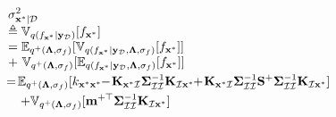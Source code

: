 \documentclass[conference]{IEEEtran}
\begin{document}
	\begin{equation*}
		\hspace{-1.7mm}
		\begin{array}{l}
			\displaystyle\sigma^2_{\mathbf{x}^*|\mathcal{D}}\\
			\displaystyle\triangleq\mathbb{V}_{q(f_{\mathbf{x}^*}|\mathbf{y}_\mathcal{D})}[f_{\mathbf{x}^*}]\\
			\displaystyle=\mathbb{E}_{q^+(\mathbf{\Lambda},\sigma_f)}[\mathbb{V}_{q(f_{\mathbf{x}^*}|\mathbf{y}_\mathcal{D},\mathbf{\Lambda},\sigma_f)}[f_{\mathbf{x}^*}]]\\
			\displaystyle +\  \mathbb{V}_{q^+(\mathbf{\Lambda},\sigma_f)}[\mathbb{E}_{q(f_{\mathbf{x}^*}|\mathbf{y}_\mathcal{D},\mathbf{\Lambda},\sigma_f)}[f_{\mathbf{x}^*}]]\vspace{1mm}\\
			\displaystyle\hspace{-0.5mm}=\hspace{-0.5mm}\mathbb{E}_{q^+(\mathbf{\Lambda},\sigma_f)}[k_{\mathbf{x}^*\mathbf{x}^*}\hspace{-1mm}-\hspace{-0.5mm}\mathbf{\mathbf{K}}_{\mathbf{x}^*\mathcal{I}}\mathbf{\Sigma}_\mathcal{II}^{-1}\mathbf{K}_{\mathcal{I}\mathbf{x}^*}\hspace{-1mm}+\hspace{-0.5mm}\mathbf{\mathbf{K}}_{\mathbf{x}^*\mathcal{I}}\mathbf{\Sigma}_\mathcal{II}^{-1}\mathbf{S}^+\mathbf{\Sigma}_\mathcal{II}^{-1}\mathbf{\mathbf{K}}_{\mathcal{I}\mathbf{x}^*}]\vspace{1mm}\\
			\displaystyle\quad+\mathbb{V}_{q^+(\mathbf{\Lambda},\sigma_f)}[\mathbf{m}^{+\top} \mathbf{\Sigma}_\mathcal{II}^{-1}\mathbf{K}_{\mathcal{I}\mathbf{x}^*} ]
		\end{array}
	\end{equation*}
\end{document}
